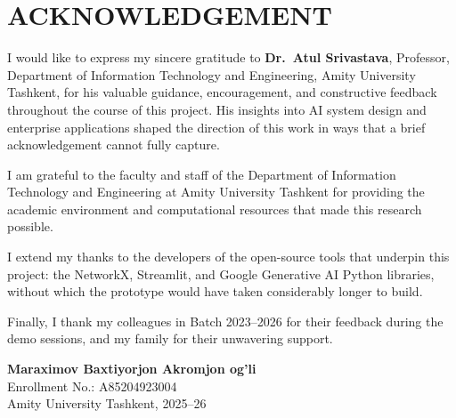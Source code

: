 \chapter*{ACKNOWLEDGEMENT}

I would like to express my sincere gratitude to \textbf{Dr.\ Atul Srivastava}, Professor,
Department of Information Technology and Engineering, Amity University Tashkent, for his
valuable guidance, encouragement, and constructive feedback throughout the course of this
project. His insights into AI system design and enterprise applications shaped the direction
of this work in ways that a brief acknowledgement cannot fully capture.

I am grateful to the faculty and staff of the Department of Information Technology and
Engineering at Amity University Tashkent for providing the academic environment and
computational resources that made this research possible.

I extend my thanks to the developers of the open-source tools that underpin this project:
the NetworkX, Streamlit, and Google Generative AI Python libraries, without which the
prototype would have taken considerably longer to build.

Finally, I thank my colleagues in Batch 2023--2026 for their feedback during the demo
sessions, and my family for their unwavering support.

\vspace{2cm}

\noindent
\textbf{Maraximov Baxtiyorjon Akromjon og'li}\\
Enrollment No.: A85204923004\\
Amity University Tashkent, 2025--26
